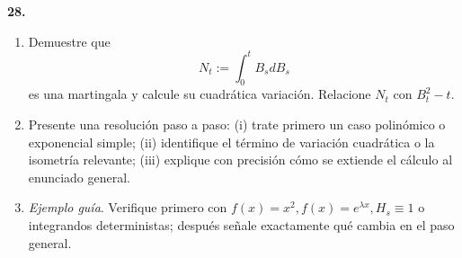\documentclass[11pt, letterpaper]{article}
\begin{document}
\newpage

\begin{ejercicio}
    \textbf{28.} 
    \begin{enumerate}
        \item Demuestre que
        \[ N_t := \int_0^t B_s dB_s \]
        es una martingala y calcule su cuadrática variación. Relacione $N_t$ con $B_t^2 - t$.
        \item Presente una resolución paso a paso: (i) trate primero un caso polinómico o exponencial simple; (ii) identifique el término de variación cuadrática o la isometría relevante; (iii) explique con precisión cómo se extiende el cálculo al enunciado general.
        \item \textit{Ejemplo guía}. Verifique primero con $f(x) = x^2, f(x) = e^{\lambda x}, H_s \equiv 1$ o integrandos deterministas; después señale exactamente qué cambia en el paso general.
    \end{enumerate}
\end{ejercicio}

\vspace{5mm}
\end{document}
